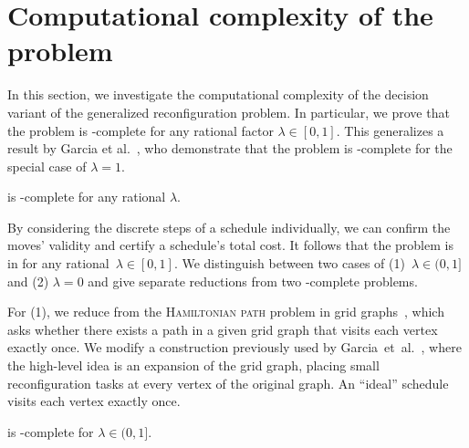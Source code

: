 \section{Computational complexity of the problem}\label{sec:computational-complexity}

In this section, we investigate the computational complexity of the decision variant of the generalized reconfiguration problem.
In particular, we prove that the problem is \NP-complete for any rational factor $\lambda\in[0,1]$.
This generalizes a result by Garcia et al.~\cite{cooperative-bille-reconfig-ICRA}, who demonstrate that the problem is \NP-complete for the special case of $\lambda=1$.

\begin{theorem}
	\label{thm:weighted-hardness}
	\probName is \NP-complete for any rational $\lambda$.
\end{theorem}

By considering the discrete steps of a schedule individually, we can confirm the moves' validity and certify a schedule's total cost.
It follows that the \probName problem is in \NP{} for any rational~$\lambda\in[0,1]$.
We distinguish between two cases of (1)~$\lambda \in (0,1]$ and (2) $\lambda = 0$ and give separate reductions from two \NP-complete problems.

For (1), we reduce from the \textsc{Hamiltonian path} problem in grid graphs~\cite{ItaiPS82}, which asks whether there exists a path in a given grid graph that visits each vertex exactly once.
We modify a construction previously used by Garcia~et~al.~\cite{cooperative-bille-reconfig-ICRA}, where the high-level idea is an expansion of the grid graph, placing small reconfiguration tasks at every vertex of the original graph.
An ``ideal'' schedule visits each vertex exactly once.
\begin{lemma}
	\label{lem:hardness-lambda-not-zero}
	\probName is \NP-complete for $\lambda\in (0,1]$.
\end{lemma}

